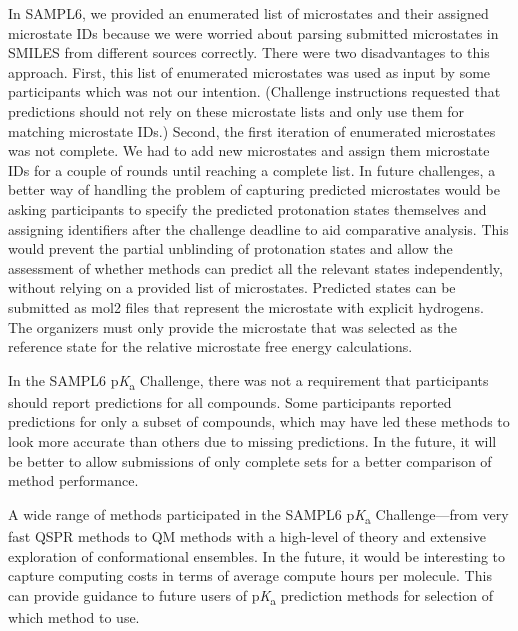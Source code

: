 \documentclass[9pt,lineno,final]{elife}
\newcommand{\pKa}{p\textit{K}\textsubscript{a}}
\begin{document}
In SAMPL6, we provided an enumerated list of microstates and their assigned microstate IDs because we were worried about parsing submitted microstates in SMILES from different sources correctly. 
There were two disadvantages to this approach. 
First, this list of enumerated microstates was used as input by some participants which was not our intention. (Challenge instructions requested that predictions should not rely on these microstate lists and only use them for matching microstate IDs.) 
Second, the first iteration of enumerated microstates was not complete. 
We had to add new microstates and assign them microstate IDs for a couple of rounds until reaching a complete list. 
In future challenges, a better way of handling the problem of capturing predicted microstates would be asking participants to specify the predicted protonation states themselves and assigning identifiers after the challenge deadline to aid comparative analysis. 
This would prevent the partial unblinding of protonation states and allow the assessment of whether methods can predict all the relevant states independently, without relying on a provided list of microstates.
Predicted states can be submitted as mol2 files that represent the microstate with explicit hydrogens. 
The organizers must only provide the microstate that was selected as the reference state for the relative microstate free energy calculations. 


In the SAMPL6 \pKa{} Challenge, there was not a requirement that participants should report predictions for all compounds. 
Some participants reported predictions for only a subset of compounds, which may have led these methods to look more accurate than others due to missing predictions.
In the future, it will be better to allow submissions of only complete sets for a better comparison of method performance. 

A wide range of methods participated in the SAMPL6 \pKa{} Challenge---from very fast QSPR methods to QM methods with a high-level of theory and extensive exploration of conformational ensembles. 
In the future, it would be interesting to capture computing costs in terms of average compute hours per molecule. 
This can provide guidance to future users of \pKa{} prediction methods for selection of which method to use.
\end{document}
